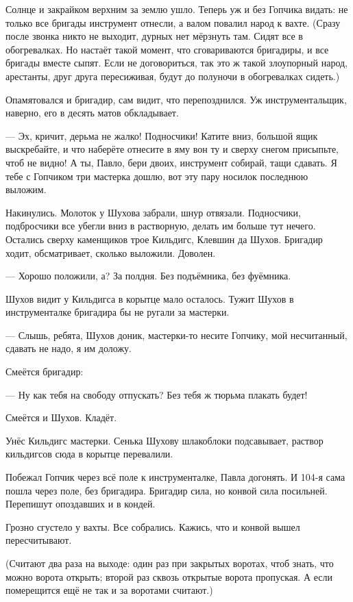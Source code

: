 Солнце и закрайком верхним за землю ушло. Теперь уж и без Гопчика видать: не только все
бригады инструмент отнесли, а валом повалил народ к вахте. (Сразу после звонка никто не
выходит, дурных нет мёрзнуть там. Сидят все в обогревалках. Но настаёт такой момент, что
сговариваются бригадиры, и все бригады вместе сыпят. Если не договориться, так это ж такой
злоупорный народ, арестанты, \dash друг друга пересиживая, будут до полуночи в обогревалках
сидеть.)

Опамятовался и бригадир, сам видит, что перепозднился. Уж инструментальщик, наверно, его в
десять матов обкладывает.

--- Эх, \dash кричит, \Dash дерьма не жалко! Подносчики! Катите вниз, большой ящик выскребайте, и что
наберёте \dash отнесите в яму вон ту и сверху снегом присыпьте, чтоб не видно! А ты, Павло, бери
двоих, инструмент собирай, тащи сдавать. Я тебе с Гопчиком три мастерка дошлю, вот эту пару
носилок последнюю выложим.

Накинулись. Молоток у Шухова забрали, шнур отвязали. Подносчики, подбросчики \dash все убегли
вниз в растворную, делать им больше тут нечего. Остались сверху каменщиков трое \dash Кильдигс,
Клевшин да Шухов. Бригадир ходит, обсматривает, сколько выложили. Доволен.

--- Хорошо положили, а? За полдня. Без подъёмника, без фуёмника.

Шухов видит \dash у Кильдигса в корытце мало осталось. Тужит Шухов \dash в инструменталке бригадира
бы не ругали за мастерки.

--- Слышь, ребята, \dash Шухов доник, \Dash мастерки-то несите Гопчику, мой \dash несчитанный, сдавать не
надо, я им доложу.

Смеётся бригадир:

--- Ну как тебя на свободу отпускать? Без тебя ж тюрьма плакать будет!

Смеётся и Шухов. Кладёт.

Унёс Кильдигс мастерки. Сенька Шухову шлакоблоки подсавывает, раствор кильдигсов сюда в
корытце перевалили.

Побежал Гопчик через всё поле к инструменталке, Павла догонять. И 104-я сама пошла через поле,
без бригадира. Бригадир \dash сила, но конвой \dash сила посильней. Перепишут опоздавших \dash и в
кондей.

Грозно сгустело у вахты. Все собрались. Кажись, что и конвой вышел \dash пересчитывают.

(Считают два раза на выходе: один раз при закрытых воротах, чтоб знать, что можно ворота
открыть; второй раз \dash сквозь открытые ворота пропуская. А если померещится ещё не так \dash и за
воротами считают.)

